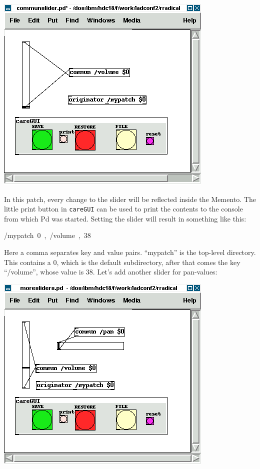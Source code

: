 \documentclass[10pt,english]{scrartcl}
\begin{document}
\includegraphics{communslider.png}

In this patch, every change to the slider will be reflected inside the
Memento. The little print button in \texttt{careGUI} can be used to print the
contents to the console from which Pd was started. Setting the slider will
result in something like this:
\begin{ttfamily}\begin{flushleft}
\mbox{/mypatch~0~,~/volume~,~38}
\end{flushleft}\end{ttfamily}

Here a comma separates key and value pairs. ``mypatch'' is the top-level
directory. This contains a 0, which is the default subdirectory, after that
comes the key ``/volume'', whose value is 38. Let's add another slider for
pan-values:

\includegraphics{moresliders.png}
\end{document}
